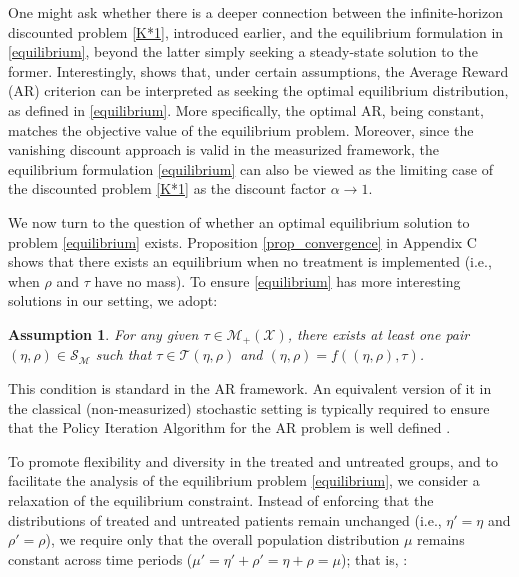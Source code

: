 \documentclass[12pt,a4paper]{article}
\newtheorem{assumption}{Assumption}[section]
\newcommand{\mS}{\mathcal{S}}
\newcommand{\mM}{\mathcal{M}}
\newcommand{\mMplusX}{\mathcal{M}_{+}(\mathcal{X})}
\begin{document}
One might ask whether there is a deeper connection between the infinite-horizon discounted problem \eqref{K*1}, introduced earlier, and the equilibrium formulation in \eqref{equilibrium}, beyond the latter simply seeking a steady-state solution to the former. Interestingly, \cite{measurized} shows that, under certain assumptions, the Average Reward (AR) criterion can be interpreted as seeking the optimal equilibrium distribution, as defined in \eqref{equilibrium}. More specifically, the optimal AR, being constant, matches the objective value of the equilibrium problem. Moreover, since the vanishing discount approach is valid in the measurized framework, the equilibrium formulation \eqref{equilibrium} can also be viewed as the limiting case of the discounted problem \eqref{K*1} as the discount factor $\alpha \to 1$. %

We now turn to the question of whether an optimal equilibrium solution to problem \eqref{equilibrium} exists. Proposition \ref{prop_convergence} in Appendix C shows that there exists an equilibrium when no treatment is implemented (i.e., when $\rho$ and $\tau$ have no mass). To ensure \eqref{equilibrium} has more interesting solutions in our setting, we adopt:

	
		\begin{assumption}
			For any given $\tau\in \mMplusX$, there exists at least one pair $(\eta,\rho)\in \mS_{\mM}$ such that $\tau\in \mathcal{T}(\eta,\rho)$ and $(\eta,\rho)=f((\eta,\rho),\tau)$.
		\end{assumption}
	
  	

\noindent This condition is standard in the AR framework. An equivalent version of it in the classical (non-measurized) stochastic setting is typically required to ensure that the Policy Iteration Algorithm for the AR problem is well defined \citep{PIA}.


    	
To promote flexibility and diversity in the treated and untreated groups, and to facilitate the analysis of the equilibrium problem \eqref{equilibrium}, we consider a relaxation of the equilibrium constraint. Instead of enforcing that the distributions of treated and untreated patients remain unchanged (i.e., $\eta' = \eta$ and $\rho' = \rho$), we require only that the overall population distribution $\mu$ remains constant across time periods ($\mu' = \eta' + \rho' = \eta + \rho = \mu$); that is, :
\end{document}

